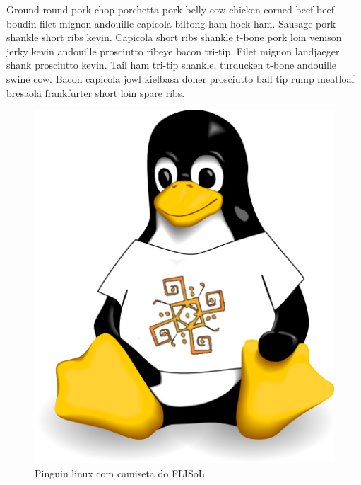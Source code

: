 \documentclass[a4paper,11pt]{article}
\begin{document}
Ground round pork chop porchetta pork belly cow chicken corned beef beef boudin filet mignon andouille capicola biltong ham hock ham. Sausage pork shankle short ribs kevin. Capicola short ribs shankle t-bone pork loin venison jerky kevin andouille prosciutto ribeye bacon tri-tip. Filet mignon landjaeger shank prosciutto kevin. Tail ham tri-tip shankle, turducken t-bone andouille swine cow. Bacon capicola jowl kielbasa doner prosciutto ball tip rump meatloaf bresaola frankfurter short loin spare ribs.

\begin{figure}[t]
   \begin{center}
      \includegraphics[scale=0.5]{figura_3.png}
      \caption{Pinguin linux com camiseta do FLISoL}
      \label{Homer}
   \end{center}
\end{figure}
\end{document}
